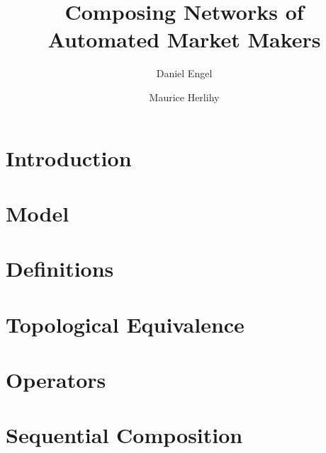 \documentclass[sigconf,review=false,screen,10pt]{acmart} %
\begin{document}
\title{Composing Networks of Automated Market Makers}


\author{Daniel Engel}

\author{Maurice Herlihy}

\begin{abstract}

\end{abstract}


\maketitle

\section{Introduction}


\section{Model}


\section{Definitions}


\section{Topological Equivalence}


\section{Operators}


\section{Sequential Composition}

\end{document}
